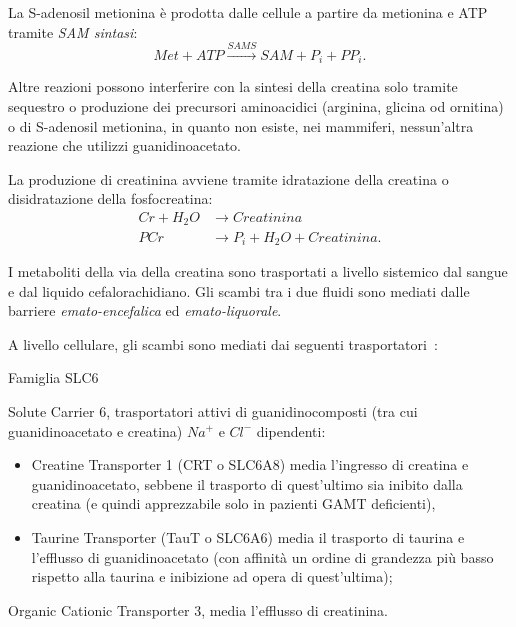 		La S-adenosil metionina \`e prodotta dalle cellule a partire da metionina e ATP tramite \emph{SAM sintasi}:
		\begin{equation}
			Met + ATP \xrightarrow{SAMS} SAM + P_i + PP_i.
		\end{equation}
		
		Altre reazioni possono interferire con la sintesi della creatina solo tramite sequestro o produzione dei precursori aminoacidici (arginina, glicina od ornitina) o di S-adenosil metionina, in quanto non esiste, nei mammiferi, nessun'altra reazione che utilizzi guanidinoacetato.
		
		La produzione di creatinina avviene tramite idratazione della creatina o disidratazione della fosfocreatina:
		\begin{align*}
			Cr + H_2O &\rightarrow Creatinina\\
			PCr &\rightarrow P_i + H_2O + Creatinina.
		\end{align*}
		
		I metaboliti della via della creatina sono trasportati a livello sistemico dal sangue e dal liquido cefalorachidiano.
		Gli scambi tra i due fluidi sono mediati dalle barriere \emph{emato-encefalica} ed \emph{emato-liquorale}.
		
		A livello cellulare, gli scambi sono mediati dai seguenti trasportatori~\cite{tachikawa2011transport}:
		\begin{labeling}{Famiglia SLC6}
			\item [Famiglia SLC6] Solute Carrier 6, trasportatori attivi di guanidinocomposti (tra cui guanidinoacetato e creatina) $Na^+$ e $Cl^-$ dipendenti:
			\begin{itemize}
				\item Creatine Transporter 1 (CRT o SLC6A8) media l'ingresso di creatina e guanidinoacetato, sebbene il trasporto di quest'ultimo sia inibito dalla creatina (e quindi apprezzabile solo in pazienti GAMT deficienti),
				\item Taurine Transporter (TauT o SLC6A6) media il trasporto di taurina e l'efflusso di guanidinoacetato (con affinit\`a un ordine di grandezza pi\`u basso rispetto alla taurina e inibizione ad opera di quest'ultima);
			\end{itemize}
			\item [OCT3] Organic Cationic Transporter 3, media l'efflusso di creatinina.
		\end{labeling}
		
